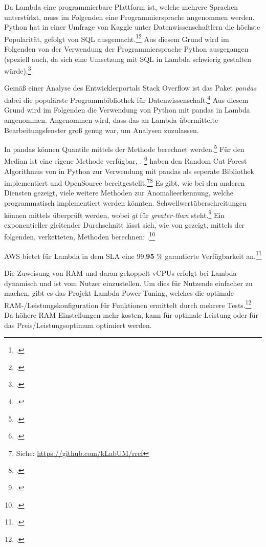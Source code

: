 Da Lambda eine programmierbare Plattform ist, welche mehrere Sprachen unterstützt, muss im Folgenden eine Programmiersprache angenommen werden. Python hat in einer Umfrage von Kaggle unter Datenwissenschaftlern die höchste Popularität, gefolgt von \ac{SQL} ausgemacht.\footcite[Vgl.][]{KaggleInc..2019}\nzitat\footcite[Vgl.][]{Hayes.2020} Aus diesem Grund wird im Folgenden von der Verwendung der Programmiersprache Python ausgegangen (speziell auch, da sich eine Umsetzung mit \ac{SQL} in Lambda schwierig gestalten würde).\footcite[Vgl.][]{Hayes.2020} 

Gemäß einer Analyse des Entwicklerportals Stack Overflow ist das Paket \textit{pandas} dabei die populärste Programmbibliothek für Datenwissenschaft.\footcite[Vgl.][]{Robinson.2017} Aus diesem Grund wird im Folgenden die Verwendung von Python mit pandas in Lambda angenommen. Angenommen wird, dass das an Lambda übermittelte Bearbeitungsfenster groß genug war, um Analysen zuzulassen.

In pandas können Quantile mittels der  Methode berechnet werden.\footcite[Vgl.][]{o.V..o.J.c} Für den Median ist eine eigene Methode verfügbar, . \footcite[Vgl.][]{o.V..o.J.d}
\citeauthor{Bartos.2019} haben den Random Cut Forest Algorithmus von \citeauthor{Guha.2016} in Python zur Verwendung mit pandas als seperate Bibliothek implementiert und OpenSource bereitgestellt.\footnote{Siehe: \url{https://github.com/kLabUM/rrcf}}\nzitat\footcite[Vgl.][]{Bartos.2019} Es gibt, wie bei den anderen Diensten gezeigt, viele weitere Methoden zur Anomalieerkennung, welche programmatisch implementiert werden könnten.
Schwellwertüberschreitungen können mittels  überprüft werden, wobei \textit{gt} für \textit{greater-than} steht.\footcite[Vgl.][]{o.V..o.J.e}
Ein exponentieller gleitender Durchschnitt lässt sich, wie von \citeauthor{Sharma.2019} gezeigt, mittels der folgenden, verketteten, Methoden berechnen: .\footcite[Vgl.][]{Sharma.2019} 

\ac{AWS} bietet für Lambda in dem \ac{SLA} eine 99,\textbf{95} \% garantierte Verfügbarkeit an.\footcite[Vgl.][]{AmazonWebServicesInc..2019d}

Die Zuweisung von \ac{RAM} und daran gekoppelt vCPUs erfolgt bei Lambda dynamisch und ist vom Nutzer einzustellen. Um dies für Nutzende einfacher zu machen, gibt es das Projekt Lambda Power Tuning, welches die optimale \ac{RAM}-/Leistungskonfiguration für Funktionen ermittelt durch mehrere Tests.\footcite[Vgl. auch im Folgenden][]{AmazonWebServicesInc..o.J.at} Da höhere \ac{RAM} Einstellungen mehr kosten, kann für optimale Leistung oder für das Preis/Leistungsoptimum optimiert werden.

